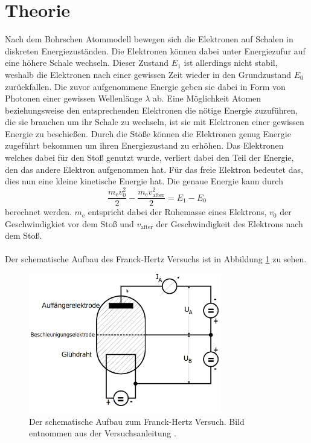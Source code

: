 \section{Theorie}
\label{sec:Theorie}
Nach dem Bohrschen Atommodell bewegen sich die Elektronen auf Schalen in diskreten Energiezuständen.
Die Elektronen können dabei unter Energiezufur auf eine höhere Schale wechseln.
Dieser Zustand $E_1$ ist allerdings nicht stabil, weshalb die Elektronen nach einer gewissen Zeit wieder in den Grundzustand $E_0$ zurückfallen.
Die zuvor aufgenommene Energie geben sie dabei in Form von Photonen einer gewissen Wellenlänge $\lambda$ ab.
Eine Möglichkeit Atomen beziehungsweise den entsprechenden Elektronen die nötige Energie zuzuführen, die sie brauchen um ihr Schale zu wechseln, ist sie mit Elektronen einer gewissen Energie zu beschießen.
Durch die Stöße können die Elektronen genug Energie zugeführt bekommen um ihren Energiezustand zu erhöhen.
Das Elektronen welches dabei für den Stoß genutzt wurde, verliert dabei den Teil der Energie, den das andere Elektron aufgenommen hat.
Für das freie Elektron bedeutet das, dies nun eine kleine kinetische Energie hat.
Die genaue Energie kann durch 
\begin{equation*}
    \frac{m_\text{e} v_0^2}{2} - \frac{m_\text{e}v_\text{after}^2}{2} = E_1 - E_0
\end{equation*} 
berechnet werden. $m_\text{e}$ entspricht dabei der Ruhemasse eines Elektrons, $v_0$ der Geschwindigkiet vor dem Stoß und $v_\text{after}$ der Geschwindigkeit des Elektrons nach dem Stoß.
\\\\
Der schematische Aufbau des Franck-Hertz Versuchs ist in Abbildung \ref{fig:schematischeraufbau} zu sehen.
\begin{figure}
    \centering
    \includegraphics[width=0.75\textwidth]{content/data/schematischeraufbau.png}
    \caption{Der schematische Aufbau zum Franck-Hertz Versuch. Bild entnommen aus der Versuchsanleitung \cite[2]{anleitung}.}
    \label{fig:schematischeraufbau}
\end{figure}
